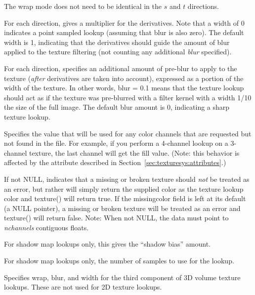 The wrap mode does not need to be identical in the $s$ and $t$
directions.
\apiend

For each direction, gives a multiplier for the derivatives.  Note that
a width of 0 indicates a point sampled lookup (assuming that blur is
also zero).  The default width is 1, indicating that the derivatives
should guide the amount of blur applied to the texture filtering (not
counting any additional \emph{blur} specified).
\apiend

For each direction, specifies an additional amount of pre-blur to apply
to the texture (\emph{after} derivatives are taken into account),
expressed as a portion of the width of the texture.  In other words,
blur = 0.1 means that the texture lookup should act as if the texture
was pre-blurred with a filter kernel with a width 1/10 the size of the
full image.  The default blur amount is 0, indicating a sharp texture
lookup.
\apiend

Specifies the value that will be used for any color channels that are
requested but not found in the file.  For example, if you perform a
4-channel lookup on a 3-channel texture, the last channel will
get the fill value.  (Note: this behavior is affected by the
 attribute described in 
Section~\ref{sec:texturesys:attributes}.)
\apiend

If not NULL, indicates that a missing or broken texture should \emph{not}
be treated as an error, but rather will simply return the supplied color
as the texture lookup color and {\cf texture()} will return {\cf true}.  
If the {\cf missingcolor} field is left at its default (a NULL pointer),
a missing or broken texture will be treated as an error and
{\cf texture()} will return {\cf false}.
Note: When not NULL, the data must point to \emph{nchannels} contiguous floats.
\apiend

For shadow map lookups only, this gives the ``shadow bias'' amount.
\apiend

For shadow map lookups only, the number of samples to use for the lookup.
\apiend

Specifies wrap, blur, and width for the third component of 3D volume texture
lookups.  These are not used for 2D texture lookups.
\apiend

\subsection{\TextureOptions}

